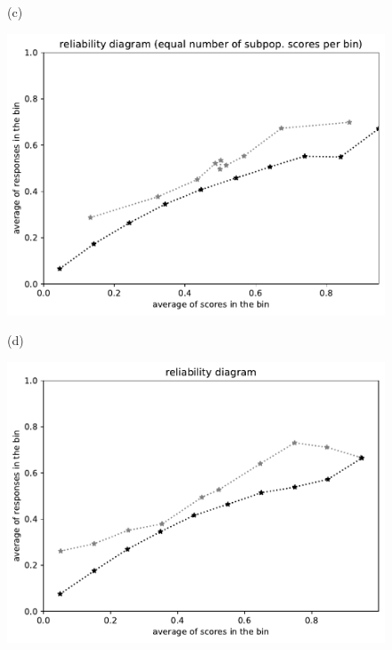 \documentclass{article}
\newlength{\vertsep}
\newlength{\imsize}
\begin{document}
\begin{figure}
\begin{centering}
(c)
\parbox{\imsize}{\includegraphics[width=\imsize]
{../codes/unweighted/10000_7000_10_0/equisamps.pdf}}
\quad\quad
(d)
\parbox{\imsize}{\includegraphics[width=\imsize]
{../codes/unweighted/10000_7000_10_0/equiscore.pdf}}

\vspace{\vertsep}


\end{centering}
\end{figure}
\end{document}
